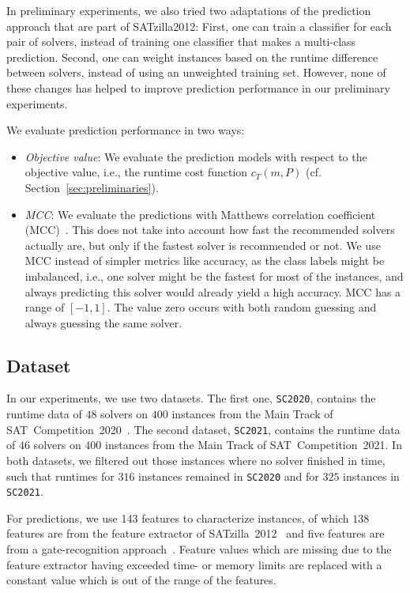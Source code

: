 \documentclass[runningheads]{llncs}
\begin{document}
In preliminary experiments, we also tried two adaptations of the prediction approach that are part of SATzilla2012:
First, one can train a classifier for each pair of solvers, instead of training one classifier that makes a multi-class prediction.
Second, one can weight instances based on the runtime difference between solvers, instead of using an unweighted training set.
However, none of these changes has helped to improve prediction performance in our preliminary experiments.

We evaluate prediction performance in two ways:

\begin{itemize}
	\item \emph{Objective value}:
	We evaluate the prediction models with respect to the objective value, i.e., the runtime cost function $c_{T}(m,P)$ (cf. Section~\ref{sec:preliminaries}). 
	\item \emph{MCC}:
	We evaluate the predictions with Matthews correlation coefficient (MCC)~\cite{matthews1975comparison,gorodkin2004comparing}.
	This does not take into account how fast the recommended solvers actually are, but only if the fastest solver is recommended or not.
	We use MCC instead of simpler metrics like accuracy, as the class labels might be imbalanced, i.e., one solver might be the fastest for most of the instances, and always predicting this solver would already yield a high accuracy.
	MCC has a range of $[-1,1]$. 
	The value zero occurs with both random guessing and always guessing the same solver.
\end{itemize}

\subsection{Dataset}

In our experiments, we use two datasets. 
The first one, \texttt{SC2020}, contains the runtime data of $48$ solvers on $400$ instances from the Main Track of SAT~Competition~2020~\cite{balyo2020proceedings,SC2020:AIJ}.
The second dataset, \texttt{SC2021}, contains the runtime data of $46$ solvers on $400$ instances from the Main Track of SAT~Competition~2021. 
In both datasets, we filtered out those instances where no solver finished in time, such that runtimes for $316$ instances remained in \texttt{SC2020} and for $325$ instances in \texttt{SC2021}.

For predictions, we use 143 features to characterize instances, of which $138$ features are from the feature extractor of SATzilla~2012~\cite{xu2008satzilla,xu2012satzilla2012} and five features are from a gate-recognition approach~\cite{Iser:2015:GateRecognition}. 
Feature values which are missing due to the feature extractor having exceeded time- or memory limits are replaced with a constant value which is out of the range of the features.
\end{document}
